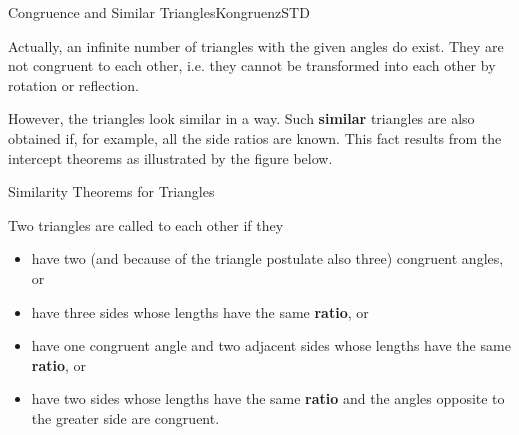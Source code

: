 \begin{MXContent}{Congruence and Similar Triangles}{Kongruenz}{STD}
\begin{MExample}
Actually, an infinite number of triangles with the given angles do exist. They 
are not congruent to each other, i.e. they cannot be transformed into each other 
by rotation or reflection.
\end{MExample}


However, the triangles look similar in a way. Such \textbf{similar} triangles are 
also obtained if, for example, all the side ratios are known. This fact results
from the intercept theorems as illustrated by the figure below. 

\begin{center}
\end{center}

\begin{MXInfo}{Similarity Theorems for Triangles}%

Two triangles are called  to each other
if they
\begin{itemize}
 \item have two (and because of the triangle postulate also three) congruent angles, or
 \item have three sides whose lengths have the same \textbf{ratio}, or
 \item have one congruent angle and two adjacent sides whose 
  lengths have the same \textbf{ratio}, or
 \item have two sides whose 
  lengths have the same \textbf{ratio} and the angles
  opposite to the greater side are congruent.
\end{itemize}
\end{MXInfo}


\end{MXContent}
